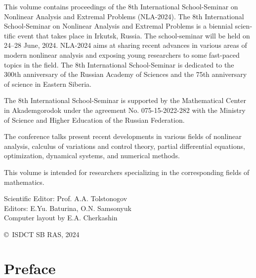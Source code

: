 \documentclass[12pt,final]{llncs}
\begin{document}
 \begin{english}
   This volume contains proceedings of the 8th International School-Seminar on Nonlinear Analysis and Extremal Problems (NLA-2024).
   The 8th International School-Seminar on Nonlinear Analysis and Extremal Problems is a biennial scientific event that takes place in Irkutsk, Russia. The school-seminar  will be held on 24--28 June, 2024. NLA-2024 aims at sharing recent advances in various areas of modern nonlinear analysis and exposing young researchers to some fast-paced topics in the field. The 8th International School-Seminar is dedicated to the 300th anniversary of the Russian Academy of Sciences and the 75th anniversary of science in Eastern Siberia.

   The 8th International School-Seminar is supported by the Mathematical Center in Akademgorodok under the agreement No. 075-15-2022-282 with the Ministry of Science and Higher Education of the Russian Federation.

   The conference talks present recent developments in
   various fields of nonlinear analysis, calculus of variations and control theory,  partial differential equations, optimization, dynamical systems,
   and  numerical methods.

   This volume is intended for researchers specializing in the corresponding fields of  ma\-the\-ma\-tics.
 \end{english}
  \vspace{1cm}



 \vfill

  \vfill

 Scientific Editor: Prof. A.\;A. Tolstonogov\\[0.3em]

 Editors: E.\;Yu. Baturina, O.\;N. Samsonyuk\\[0.3em]

 Computer layout by E.\;A. Cherkashin

 \vfill



 \begin{flushright}
 \copyright\ ISDCT SB RAS, 2024
\end{flushright}


\chapter*{Preface}
%
\end{document}
